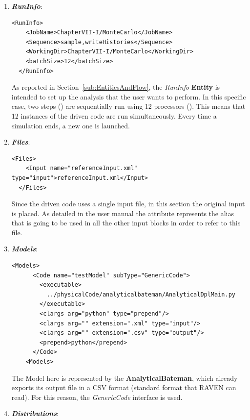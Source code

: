 \begin{enumerate}
   \item \textbf{\textit{RunInfo}}:
\begin{lstlisting}[style=XML,morekeywords={arg,extension,pauseAtEnd,overwrite}]
  <RunInfo>
    <JobName>ChapterVII-I/MonteCarlo</JobName>
    <Sequence>sample,writeHistories</Sequence>
    <WorkingDir>ChapterVII-I/MonteCarlo</WorkingDir>
    <batchSize>12</batchSize>
  </RunInfo>
\end{lstlisting}   
   As reported in Section~\ref{sub:EntitiesAndFlow}, the \textit{RunInfo} \textbf{Entity} is intended to set up the analysis 
   that the user wants to perform. In this specific case, two steps () are sequentially run 
   using 12 processors (). This means that
   12 instances of the driven code are run simultaneously. 
   Every time a simulation ends, a new one is launched.
   \item \textbf{\textit{Files}}:
\begin{lstlisting}[style=XML,morekeywords={arg,extension,pauseAtEnd,overwrite}]
  <Files>
    <Input name="referenceInput.xml" type="input">referenceInput.xml</Input>
  </Files>
\end{lstlisting}
   Since the driven code uses a single input file, in this section the original input is placed. As detailed in the user manual
   the attribute   represents the alias that is going to be used in all the other input blocks in order to refer to this file.
   \item \textbf{\textit{Models}}:
\begin{lstlisting}[style=XML,morekeywords={arg,extension,pauseAtEnd,overwrite}]
   <Models>
      <Code name="testModel" subType="GenericCode">
        <executable>
          ../physicalCode/analyticalbateman/AnalyticalDplMain.py
        </executable>
        <clargs arg="python" type="prepend"/>
        <clargs arg="" extension=".xml" type="input"/>
        <clargs arg="" extension=".csv" type="output"/>
        <prepend>python</prepend>
      </Code>
    <Models>
\end{lstlisting}
 The Model here is represented by the 
 \textbf{AnalyticalBateman}, which already exports its output file in a 
 CSV format (standard format that RAVEN can read). For this reason,
 the \textit{GenericCode} interface is used.
   \item \textbf{\textit{Distributions}}:
\begin{lstlisting}[style=XML,morekeywords={arg,extension,pauseAtEnd,overwrite}]

\end{lstlisting}
\end{enumerate}
